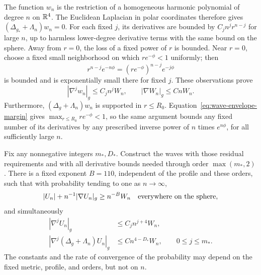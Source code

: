 The function $w_n$ is the restriction of a homogeneous harmonic
polynomial of degree $n$ on $\mathbb R^4$.  The Euclidean Laplacian in polar
coordinates therefore gives $(\Delta_{g_*}+\Lambda_n)w_n=0$.
For each fixed $j$, its derivatives are bounded by
$C_jn^j r^{n-j}$ for large $n$, up to harmless lower-degree derivative
terms with the same bound on the sphere.  Away from $r=0$, the loss
of a fixed power of $r$ is bounded.  Near $r=0$, choose a fixed small
neighborhood on which $re^{-\phi}<1$ uniformly; then
\[
 r^{n-j}e^{-n\phi}
   =(re^{-\phi})^{n-j}e^{-j\phi}
\]
is bounded and is exponentially small there for fixed $j$.
These observations prove
\begin{equation}
 |\nabla^jw_n|_g\le C_jn^jW_n,
 \qquad |\nabla W_n|_g\le CnW_n.
 \label{eq:background-weight-bounds}
\end{equation}
Furthermore, $(\Delta_g+\Lambda_n)w_n$ is supported in $r\le R_0$.
Equation~\eqref{eq:wave-envelope-margin} gives
$\max_{r\le R_0}re^{-\phi}<1$, so the same argument bounds any fixed
number of its derivatives by any prescribed inverse power of $n$
times $e^{n\phi}$, for all sufficiently large $n$.

\begin{lemma}
\label{lem:wave-noncancellation}
Fix any nonnegative integers $m_*,D_*$.  Construct the waves with
those residual requirements and with all derivative bounds needed
through order $\max(m_*,2)$.  There is a fixed exponent $B=110$,
independent of the profile and these orders, such that with probability
tending to one as $n\to\infty$,
\begin{equation}
 |U_n|+n^{-1}|\nabla U_n|_g\ge n^{-B}W_n
       \quad\hbox{everywhere on the sphere},
 \label{eq:wave-jet-lower}
\end{equation}
and simultaneously
\begin{equation}
 \begin{split}
 |\nabla^jU_n|_g&\le C_j n^{j+4}W_n,\\
 |\nabla^j(\Delta_g+\Lambda_n)U_n|_g
      &\le C n^{4-D_*}W_n,
                 \qquad 0\le j\le m_*.
 \end{split}
 \label{eq:wave-global-estimates}
\end{equation}
The constants and the rate of convergence of the probability may
depend on the fixed metric, profile, and orders, but not on $n$.
\end{lemma}

